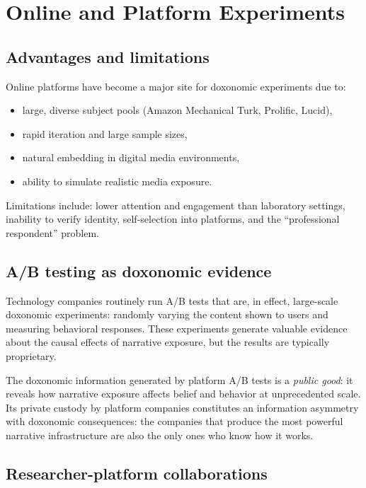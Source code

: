 \section{Online and Platform Experiments}
\label{sec:ch19-online}

\subsection{Advantages and limitations}

Online platforms have become a major site for doxonomic experiments due to:
\begin{itemize}[nosep]
  \item large, diverse subject pools (Amazon Mechanical Turk, Prolific, Lucid),
  \item rapid iteration and large sample sizes,
  \item natural embedding in digital media environments,
  \item ability to simulate realistic media exposure.
\end{itemize}

Limitations include: lower attention and engagement than laboratory settings, inability to verify identity, self-selection into platforms, and the ``professional respondent'' problem.

\subsection{A/B testing as doxonomic evidence}

Technology companies routinely run A/B tests that are, in effect, large-scale doxonomic experiments: randomly varying the content shown to users and measuring behavioral responses.
These experiments generate valuable evidence about the causal effects of narrative exposure, but the results are typically proprietary.

\begin{proposition}
\label{prop:platform-transparency}
The doxonomic information generated by platform A/B tests is a \emph{public good}: it reveals how narrative exposure affects belief and behavior at unprecedented scale.
Its private custody by platform companies constitutes an information asymmetry with doxonomic consequences: the companies that produce the most powerful narrative infrastructure are also the only ones who know how it works.
\end{proposition}

\subsection{Researcher-platform collaborations}

